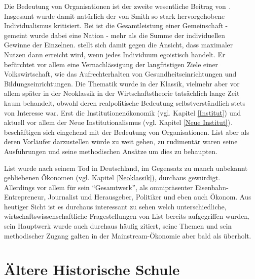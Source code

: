 Die Bedeutung von Organisationen ist der zweite wesentliche Beitrag von \textcite{List1841}. Insgesamt wurde damit natürlich der von Smith so stark hervorgehobene Individualismus kritisiert. Bei \textcite{List1841} ist die Gesamtleistung einer Gemeinschaft - gemeint wurde dabei eine Nation - mehr als die Summe der individuellen Gewinne der Einzelnen.  \textcite{List1841} stellt sich damit gegen die Ansicht, dass maximaler Nutzen dann erreicht wird, wenn jedes Individuum egoistisch handelt. Er befürchtet vor allem eine Vernachlässigung der langfristigen Ziele einer Volkswirtschaft, wie das Aufrechterhalten von Gesundheitseinrichtungen und Bildungseinrichtungen. Die Thematik wurde in der Klassik, vielmehr aber vor allem später in der Neoklassik in der Wirtschaftstheorie tatsächlich lange Zeit kaum behandelt, obwohl deren realpolitische Bedeutung selbstverständlich stets von Interesse war. Erst die Institutionenökonomik (vgl. Kapitel \ref{Institut}) und aktuell vor allem der Neue Institutionalismus (vgl. Kapitel \ref{Neue Institut}). beschäftigen sich eingehend mit der Bedeutung von Organisationen. List aber als deren Vorläufer darzustellen würde zu weit gehen, zu rudimentär waren seine Ausführungen und seine methodischen Ansätze um dies zu behaupten.

List wurde nach seinem Tod in Deutschland, im Gegensatz zu manch unbekannt gebliebenen Ökonomen (vgl. Kapitel \ref{Neoklassik}), durchaus gewürdigt. Allerdings vor allem für sein "`Gesamtwerk"', als omnipräsenter Eisenbahn-Entrepreneur, Journalist und Herausgeber, Politiker und eben auch Ökonom. Aus heutiger Sicht ist es durchaus interessant zu sehen welch unterschiedliche, wirtschaftswissenschaftliche Fragestellungen von List bereits aufgegriffen wurden, sein Hauptwerk \textcite{List1841} wurde auch durchaus häufig zitiert, seine Themen und sein methodischer Zugang galten in der Mainstream-Ökonomie aber bald als überholt.

\section{Ältere Historische Schule}
\label{Hist_Schulen}

